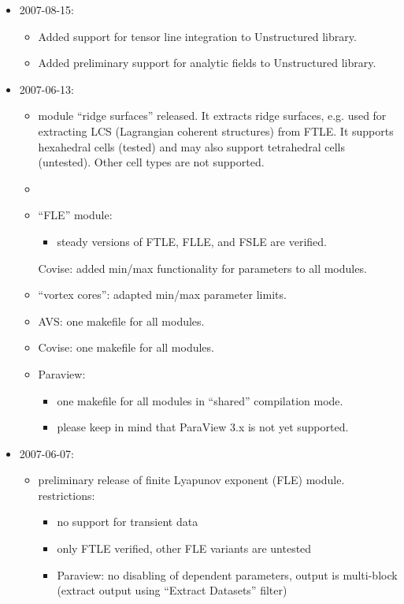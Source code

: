 \begin{itemize}
\item
  2007-08-15:
  \begin{itemize}
  \item
    Added support for tensor line integration to Unstructured library.
  \item
    Added preliminary support for analytic fields to Unstructured library.
  \end{itemize}

\item
  2007-06-13:
  \begin{itemize}
  \item
    module ``ridge surfaces'' released. It extracts ridge surfaces, e.g. used for extracting LCS (Lagrangian coherent structures) from FTLE. It supports hexahedral cells (tested) and may also support tetrahedral cells (untested). Other cell types are not supported.
  \item
  \item
    ``FLE'' module:
    \begin{itemize}
    \item
      steady versions of FTLE, FLLE, and FSLE are verified.
    \end{itemize}
    Covise: added min/max functionality for parameters to all modules.
  \item
    ``vortex cores'': adapted min/max parameter limits.
  \item
    AVS: one makefile for all modules.
  \item
    Covise: one makefile for all modules.
  \item
    Paraview:
    \begin{itemize}
    \item
      one makefile for all modules in ``shared'' compilation mode.
    \item
      please keep in mind that ParaView 3.x is not yet supported.
    \end{itemize}
  \end{itemize}

\item
  2007-06-07:
  \begin{itemize}
  \item
    preliminary release of finite Lyapunov exponent (FLE) module.\\
    restrictions:
    \begin{itemize}
    \item
      no support for transient data
    \item
      only FTLE verified, other FLE variants are untested
    \item
      Paraview: no disabling of dependent parameters, output is multi-block (extract output using ``Extract Datasets'' filter)
    \end{itemize}


\end{itemize}
\end{itemize}
